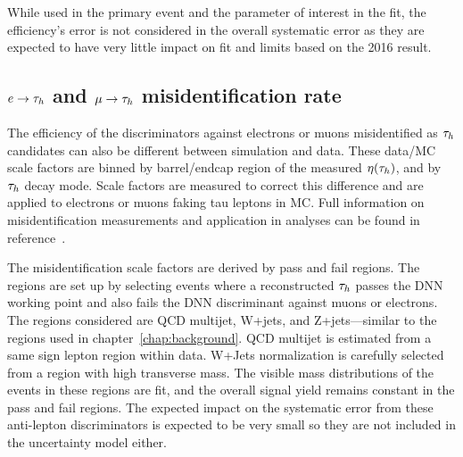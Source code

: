 While used in the primary event and the parameter of interest in the fit, the efficiency's error is not considered in the overall systematic error as they are expected to have very little impact on fit and limits based on the 2016 result. 


\subsection{$e \rightarrow \tau_h$  and $\mu \rightarrow \tau_h$ misidentification rate}
The efficiency of the discriminators against electrons or muons misidentified as $\tau_h$ candidates can also be different between simulation and data. 
These data/MC scale factors are
binned by barrel/endcap region of the measured $\eta(\tau_h)$, and by $\tau_h$ decay mode.
Scale factors are measured to correct this difference and are applied to electrons or muons faking tau leptons in MC. 
Full information on misidentification measurements and application in analyses can be found in reference~\cite{TAUIDTwiki}. 


The misidentification scale factors are derived by pass and fail regions. The regions are set up by selecting events where a reconstructed $\tau_h$ passes the DNN working point and also fails the DNN discriminant against muons or electrons. The regions considered are QCD multijet, W+jets, and Z+jets---similar to the regions used in chapter~\ref{chap:background}. QCD multijet is estimated from a same sign lepton region within data. W+Jets normalization is carefully selected from a region with high transverse mass. The visible mass distributions of the events in these regions are fit, and the overall signal yield remains constant in the pass and fail regions. 
The expected impact on the systematic error from these anti-lepton discriminators is expected to be very small so they are not included in the uncertainty model either.




